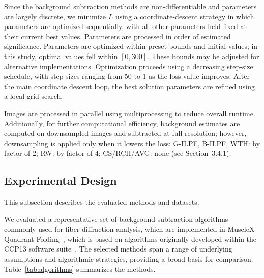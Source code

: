 \documentclass[11pt,onecolumn]{IEEEtran}
\begin{document}
Since the background subtraction methods are non-differentiable and parameters are largely discrete, we minimize $L$ using a coordinate-descent strategy in which parameters are optimized sequentially, with all other parameters held fixed at their current best values. Parameters are processed in order of estimated significance. Parameters are optimized within preset bounds and initial values; in this study, optimal values fell within $[0,300]$. These bounds may be adjusted for alternative implementations. Optimization proceeds using a decreasing step-size schedule, with step sizes ranging from 50 to 1 as the loss value improves. After the main coordinate descent loop, the best solution parameters are refined using a local grid search.

Images are processed in parallel using multiprocessing to reduce overall runtime. Additionally, for further computational efficiency, background estimates are computed on downsampled images and subtracted at full resolution; however, downsampling is applied only when it lowers the loss: G-ILPF, B-ILPF, WTH: by factor of 2; RW: by factor of 4; CS/RCH/AVG: none (see Section~3.4.1).



\subsection{Experimental Design}

This subsection describes the evaluated methods and datasets.

We evaluated a representative set of background subtraction algorithms commonly used for fiber diffraction analysis, which are implemented in MuscleX Quadrant Folding~\cite{JiratrakanvongEtAl2024}, which is based on algorithms originally developed within the CCP13 software suite~\cite{HeEtAl2007}. The selected methods span a range of underlying assumptions and algorithmic strategies, providing a broad basis for comparison. Table~\ref{tab:algorithms} summarizes the methods.
\end{document}

